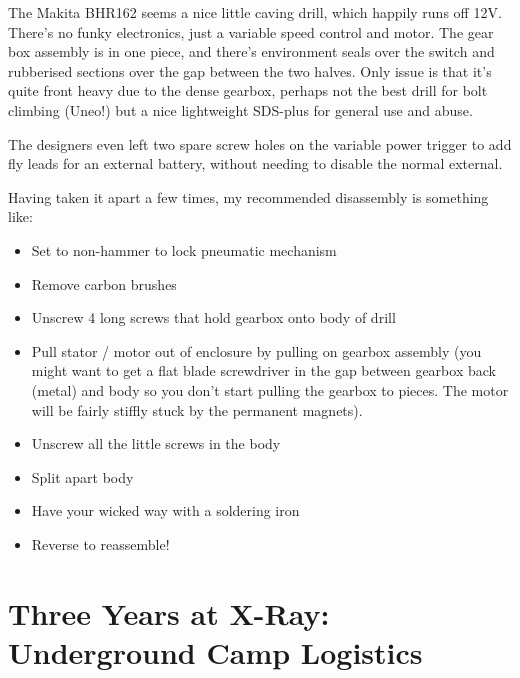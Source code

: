 The Makita BHR162 seems a nice little caving drill, which happily runs
off 12V. There’s no funky electronics, just a variable speed control
and motor. The gear box assembly is in one piece, and there’s
environment seals over the switch and rubberised sections over the gap
between the two halves. Only issue is that it’s quite front heavy due
to the dense gearbox, perhaps not the best drill for bolt climbing
(Uneo!) but a nice lightweight SDS-plus for general use and abuse.

The designers even left two spare screw holes on the variable power
trigger to add fly leads for an external battery, without needing to
disable the normal external.

Having taken it apart a few times, my recommended disassembly is something like:

\begin{itemize}
    \item Set to non-hammer to lock pneumatic mechanism
    \item Remove carbon brushes
    \item Unscrew 4 long screws that hold gearbox onto body of drill
    \item Pull stator / motor out of enclosure by pulling on gearbox assembly (you might want to get a flat blade screwdriver in the gap between gearbox back (metal) and body so you don’t start pulling the gearbox to pieces. The motor will be fairly stiffly stuck by the permanent magnets).
    \item Unscrew all the little screws in the body
    \item Split apart body
    \item Have your wicked way with a soldering iron
    \item Reverse to reassemble!
\end{itemize}




\newpage

\section{Three Years at X-Ray: Underground Camp Logistics}

